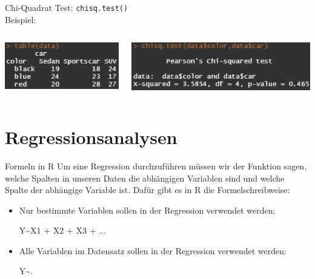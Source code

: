 \documentclass[xcolor=dvipsnames, aspectratio = 169]{beamer}
\begin{document}
\begin{frame}[fragile]{Chi-Quadrat Test:}	
	\verb +chisq.test()+ \\

	Beispiel: \\
	\begin{columns}[T]
		\begin{column}{0.4\textwidth}
			\includegraphics{tabledata}
		\end{column}
		\begin{column}{0.6\textwidth}
			\includegraphics{chisq}
		\end{column}
	\end{columns}
\end{frame}


\section{Regressionsanalysen}

\begin{frame}[fragile]{Formeln in R}
	Um eine Regression durchzuführen müssen wir der Funktion sagen, welche Spalten in unseren Daten die abhängigen Variablen sind und welche Spalte der abhängige Variable ist. Dafür gibt 	es in R die Formelschreibweise:
	\begin{itemize}
		\item Nur bestimmte Variablen sollen in der Regression verwendet werden:
			\begin{center}
				Y\textasciitilde X1 + X2 + X3 + ... 
			\end{center}
		\item Alle Variablen im Datensatz sollen in der Regression verwendet werden:
			\begin{center}
				Y\textasciitilde.
			\end{center}
	\end{itemize}
\end{frame}
\end{document}
